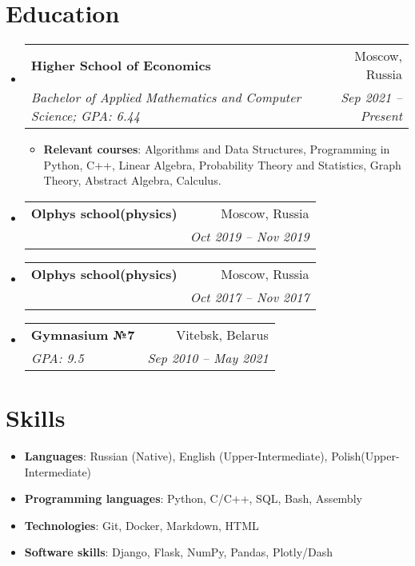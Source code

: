 \documentclass{resume}
\makeatletter
\newcommand{\resumeItem}[2]{
  \item\small{
    \textbf{#1}{: #2 \vspace{-2pt}}
  }
}
\newcommand{\resumeSubheading}[4]{
  \vspace{-1pt}\item
    \begin{tabular*}{0.97\textwidth}[t]{l@{\extracolsep{\fill}}r}
      \textbf{#1} & #2 \\
      \textit{\small#3} & \textit{\small #4} \\
    \end{tabular*}\vspace{-5pt}
}
\newcommand{\resumeSubHeadingListStart}{\begin{itemize}[leftmargin=*]}
\newcommand{\resumeSubHeadingListEnd}{\end{itemize}}
\newcommand{\resumeItemListStart}{\begin{itemize}}
\newcommand{\resumeItemListEnd}{\end{itemize}\vspace{-5pt}}
\makeatother
\begin{document}
\section{Education}
  \resumeSubHeadingListStart
    \resumeSubheading
      {Higher School of Economics}{Moscow, Russia}
      {Bachelor of Applied Mathematics and Computer Science;  GPA: 6.44}{Sep 2021 -- Present}
      \resumeItemListStart
      \medskip
      \resumeItem{Relevant courses} {Algorithms and Data Structures, Programming in Python, C++, Linear Algebra, Probability Theory and Statistics, Graph Theory, Abstract Algebra, Calculus.}
      \resumeItemListEnd
      \bigskip
      \resumeSubheading
        {Olphys school(physics)}{Moscow, Russia}{}{Oct 2019 -- Nov 2019}
        \bigskip
      \resumeSubheading
        {Olphys school(physics)}{Moscow, Russia}{}{Oct 2017 -- Nov 2017}
        \bigskip
      \resumeSubheading
        {Gymnasium №7}{Vitebsk, Belarus}{GPA: 9.5}{Sep 2010 -- May 2021}
  \resumeSubHeadingListEnd

\section{Skills}
 \resumeSubHeadingListStart
    \item{
    \textbf{Languages}{: Russian (Native), English (Upper-Intermediate), Polish(Upper-Intermediate)}
    }
    \smallskip
   \item{
     \textbf{Programming languages}{: Python, C/C++, SQL, Bash, Assembly}
   }
   \smallskip
   \item{\textbf{Technologies}{: Git, Docker, Markdown, HTML}}
   \smallskip
   \item{\textbf{Software skills}{: Django, Flask, NumPy, Pandas, Plotly/Dash}}
 \resumeSubHeadingListEnd
\end{document}
